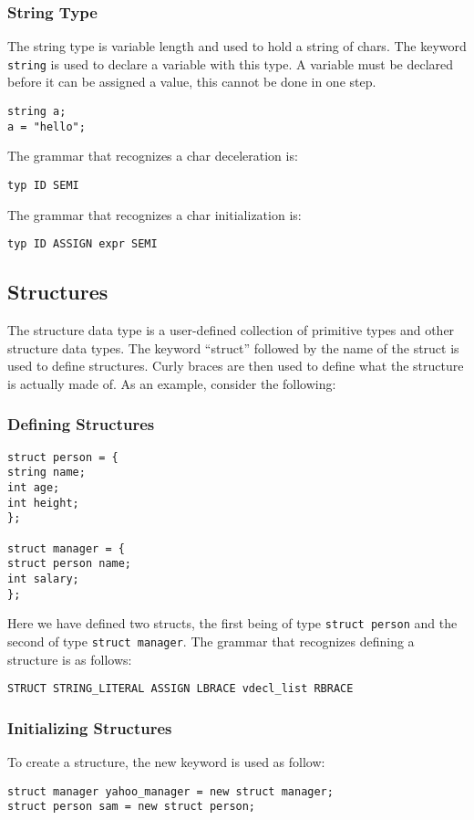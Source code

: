 \documentclass{article}
\begin{document}
\subsubsection{String Type}
The string type is variable length and used to hold a string of chars.  The keyword \texttt{string} is used to declare a variable with this type.  A variable must be declared before it can be assigned a value, this cannot be done in one step.
\begin{lstlisting}
string a;
a = "hello";
\end{lstlisting}

The grammar that recognizes a char deceleration is: 
\begin{Verbatim}[frame=single]
typ ID SEMI
\end{Verbatim}

The grammar that recognizes a char initialization is: 
\begin{Verbatim}[frame=single]
typ ID ASSIGN expr SEMI
\end{Verbatim}

\subsection{Structures}
The structure data type is a user-defined collection of primitive types and other structure data types. The keyword ``struct'' followed by the name of the struct is used to define structures. Curly braces are then used to define what the structure is actually made of. As an example, consider the following:

\subsubsection{Defining Structures}

\begin{lstlisting}
struct person = {
string name;
int age;
int height;
};

struct manager = {
struct person name;
int salary;
};
\end{lstlisting}
Here we have defined two structs, the first being of type \texttt{struct person} and the second of type \texttt{struct manager}.  The grammar that recognizes defining a structure is as follows:

\begin{Verbatim}[frame=single]
STRUCT STRING_LITERAL ASSIGN LBRACE vdecl_list RBRACE
\end{Verbatim}

\subsubsection{Initializing Structures}
To create a structure, the new keyword is used as follow:
\begin{lstlisting}
struct manager yahoo_manager = new struct manager;
struct person sam = new struct person;
\end{lstlisting}
\end{document}
